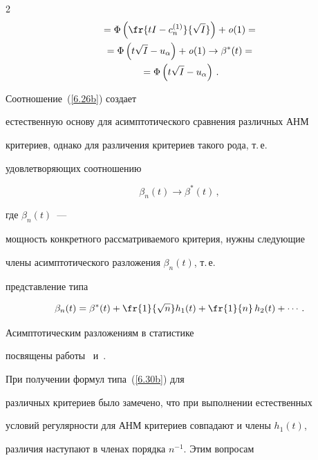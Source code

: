 \begin{multicols}{2}
\begin{multline*}
{}=


\Phi\left (\fr{tI-c_n^{(1)}}{\sqrt{I}}\right )+{\it o}(1)={}\\


{} = \Phi\left ( t\sqrt{I} - u_{\alpha}\right )+{\it o}(1)\to


\beta^*(t) ={}\\


{}= \Phi\left (t\sqrt{I} - u_{\alpha}\right )\,.




\end{multline*}


Соотношение~(\ref{6.26b}) создает


естественную основу для асимптотического сравнения различных АНМ


критериев, однако для различения критериев такого рода, т.\,е.\


удовлетворяющих соотношению


\begin{equation*}


\beta_n(t)\to \beta^*(t)\,,




\end{equation*}


где $\beta_n(t)$~---


мощность конкретного рассматриваемого критерия, нужны следующие


члены асимптотического разложения $\beta_n(t)$, т.\,е.\


представление типа


\begin{equation}


\beta_n(t) = \beta^*(t) + \fr{1}{\sqrt{n}}h_1(t) + \fr{1}{n}\,h_2(t)


+ \cdots\,. \label{6.30b}


\end{equation}


Асимптотическим разложениям в статистике


посвящены работы~\cite{26be} и~\cite{51be}.


При получении формул типа~(\ref{6.30b}) для


различных критериев было замечено, что при выполнении естественных


условий регулярности для АНМ критериев совпадают и члены $h_1(t)$,


различия наступают в членах порядка $n^{-1}$. Этим вопросам



\end{multicols}
